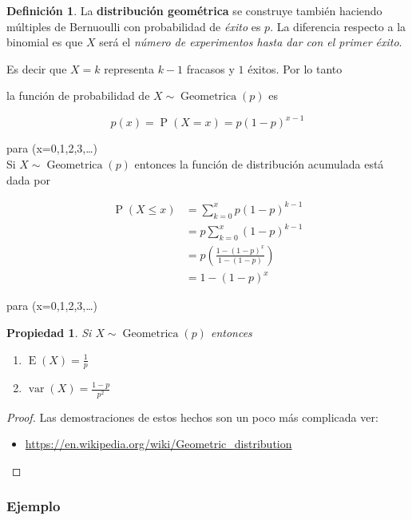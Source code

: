 \documentclass[]{book}
\providecommand{\tightlist}{%
  \setlength{\itemsep}{0pt}\setlength{\parskip}{0pt}}
\theoremstyle{plain}
\newtheorem{property}[theorem]{Propiedad}
\theoremstyle{definition}
\newtheorem{definition}[theorem]{Definición}
\theoremstyle{definition} %
\begin{document}
\begin{definition}
  
La \textbf{distribución geométrica} se construye también haciendo
múltiples de Bernuoulli con probabilidad de \emph{éxito} es \(p\). La
diferencia respecto a la binomial es que \(X\) será el \emph{número de
experimentos hasta dar con el primer éxito}.

Es decir que \(X=k\) representa \(k-1\) fracasos y \(1\) éxitos. Por lo
tanto

la función de probabilidad de
\(\displaystyle X\sim \operatorname {Geometrica} (p)\) es

\[p(x) = \displaystyle \operatorname {P} (X=x)=p(1-p)^{x-1}\]

para (x=0,1,2,3,\dots )\\

Si \(X\sim \operatorname {Geometrica} (p)\) entonces la función de
distribución acumulada está dada por

\[\begin{aligned}\operatorname {P} (X\leq x)&=\sum _{k=0}^{x}p(1-p)^{k-1}\\&=p\sum _{k=0}^{x}(1-p)^{k-1}\\&=p\left({\frac {1-(1-p)^{x}}{1-(1-p)}}\right)\\&=1-(1-p)^{x}\end{aligned}\]

para (x=0,1,2,3,\dots)
\end{definition}

\begin{property}
  Si \(X\sim \operatorname {Geometrica} (p)\) entonces
\begin{enumerate}
  \item $\operatorname {E} (X)={\frac {1}{p}}$
  \item $\operatorname {var} (X)={\frac {1-p}{p^{2}}}$
\end{enumerate}
\end{property}


\begin{proof}
  Las demostraciones de estos hechos son un poco más complicada ver:

\begin{itemize}
\tightlist
\item
  \url{https://en.wikipedia.org/wiki/Geometric_distribution}
\end{itemize}
\end{proof}


\hypertarget{ejemplo-2}{%
\subsubsection{Ejemplo}\label{ejemplo-2}}
\end{document}
